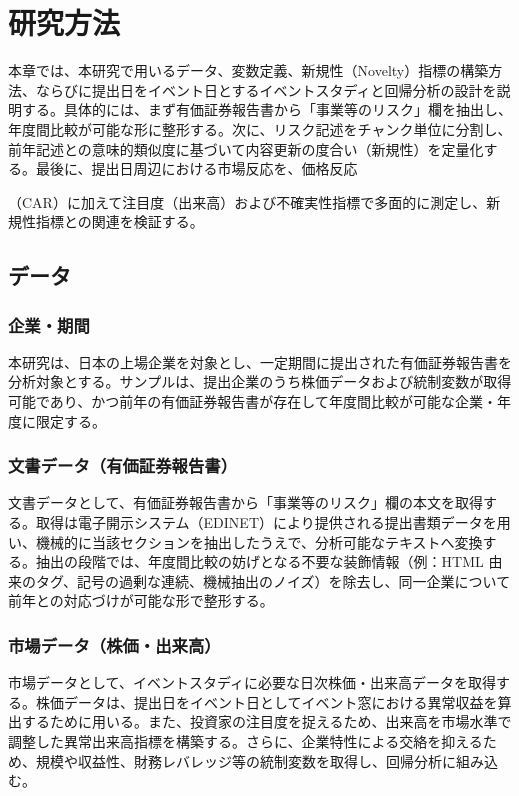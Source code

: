 \chapter[研究方法（データと分析設計）]{研究方法}

本章では、本研究で用いるデータ、変数定義、新規性（Novelty）指標の構築方法、ならびに提出日をイベント日とするイベントスタディと回帰分析の設計を説明する。具体的には、まず有価証券報告書から「事業等のリスク」欄を抽出し、年度間比較が可能な形に整形する。次に、リスク記述をチャンク単位に分割し、前年記述との意味的類似度に基づいて内容更新の度合い（新規性）を定量化する。最後に、提出日周辺における市場反応を、価格反応

（CAR）に加えて注目度（出来高）および不確実性指標で多面的に測定し、新規性指標との関連を検証する。

\section{データ}

\subsection{企業・期間}

本研究は、日本の上場企業を対象とし、一定期間に提出された有価証券報告書を分析対象とする。サンプルは、提出企業のうち株価データおよび統制変数が取得可能であり、かつ前年の有価証券報告書が存在して年度間比較が可能な企業・年度に限定する。

\subsection{文書データ（有価証券報告書）}

文書データとして、有価証券報告書から「事業等のリスク」欄の本文を取得する。取得は電子開示システム（EDINET）により提供される提出書類データを用い、機械的に当該セクションを抽出したうえで、分析可能なテキストへ変換する。抽出の段階では、年度間比較の妨げとなる不要な装飾情報（例：HTML 由来のタグ、記号の過剰な連続、機械抽出のノイズ）を除去し、同一企業について前年との対応づけが可能な形で整形する。

\subsection{市場データ（株価・出来高）}

市場データとして、イベントスタディに必要な日次株価・出来高データを取得する。株価データは、提出日をイベント日としてイベント窓における異常収益を算出するために用いる。また、投資家の注目度を捉えるため、出来高を市場水準で調整した異常出来高指標を構築する。さらに、企業特性による交絡を抑えるため、規模や収益性、財務レバレッジ等の統制変数を取得し、回帰分析に組み込む。


